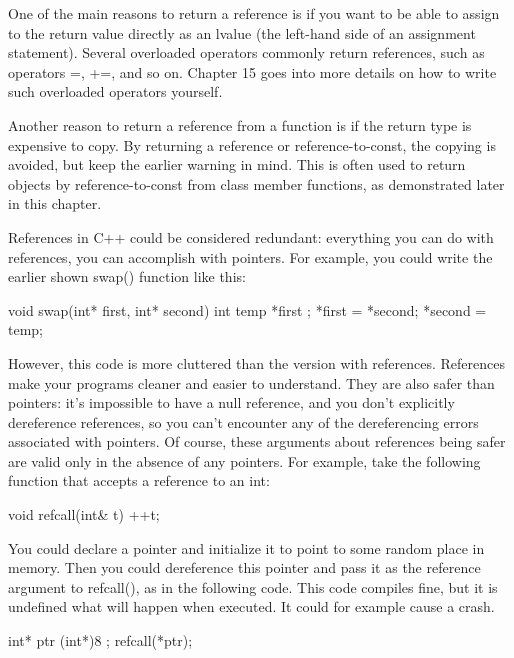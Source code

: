 One of the main reasons to return a reference is if you want to be able to assign to the return value directly as an lvalue (the left-hand side of an assignment statement). Several overloaded operators commonly return references, such as operators =, +=, and so on. Chapter 15 goes into more details on how to write such overloaded operators yourself.

Another reason to return a reference from a function is if the return type is expensive to copy. By returning a reference or reference-to-const, the copying is avoided, but keep the earlier warning in mind. This is often used to return objects by reference-to-const from class member functions, as demonstrated later in this chapter.


References in C++ could be considered redundant: everything you can do with references, you can accomplish with pointers. For example, you could write the earlier shown swap() function like this:

\begin{cpp}
void swap(int* first, int* second)
{
    int temp { *first };
    *first = *second;
    *second = temp;
}
\end{cpp}

However, this code is more cluttered than the version with references. References make your programs cleaner and easier to understand. They are also safer than pointers: it’s impossible to have a null reference, and you don’t explicitly dereference references, so you can’t encounter any of the dereferencing errors associated with pointers. Of course, these arguments about references being safer are valid only in the absence of any pointers. For example, take the following function that accepts a reference to an int:

\begin{cpp}
void refcall(int& t) { ++t; }
\end{cpp}

You could declare a pointer and initialize it to point to some random place in memory. Then you could dereference this pointer and pass it as the reference argument to refcall(), as in the following code. This code compiles fine, but it is undefined what will happen when executed. It could for example cause a crash.

\begin{cpp}
int* ptr { (int*)8 };
refcall(*ptr);
\end{cpp}

